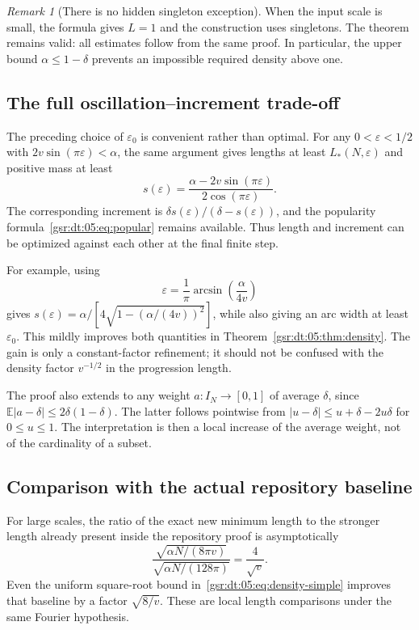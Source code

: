 \documentclass[11pt,letterpaper]{article}
\numberwithin{equation}{section}
\theoremstyle{definition}
\theoremstyle{remark}
\newtheorem{remark}[theorem]{Remark}
\newcommand{\E}{\mathbb E}
\newcommand{\1}{\mathbf 1}
\newcommand{\eps}{\varepsilon}
\begin{document}
\begin{remark}[There is no hidden singleton exception]
When the input scale is small, the formula gives $L=1$ and the construction uses singletons. The theorem remains valid: all estimates follow from the same proof. In particular, the upper bound $\alpha\leq1-\delta$ prevents an impossible required density above one.
\end{remark}

\subsection{The full oscillation--increment trade-off}
The preceding choice of $\eps_0$ is convenient rather than optimal. For any $0<\eps<1/2$ with $2v\sin(\pi\eps)<\alpha$, the same argument gives lengths at least $L_*(N,\eps)$ and positive mass at least
\begin{equation}
 s(\eps)=\frac{\alpha-2v\sin(\pi\eps)}{2\cos(\pi\eps)}.
 \label{gsr:dt:05:eq:s-epsilon}
\end{equation}
The corresponding increment is $\delta s(\eps)/(\delta-s(\eps))$, and the popularity formula~\eqref{gsr:dt:05:eq:popular} remains available. Thus length and increment can be optimized against each other at the final finite step.

For example, using
\[
 \eps=\frac1\pi\arcsin\!\left(\frac\alpha{4v}\right)
\]
gives $s(\eps)=\alpha/[4\sqrt{1-(\alpha/(4v))^2}]$, while also giving an arc width at least $\eps_0$. This mildly improves both quantities in Theorem~\ref{gsr:dt:05:thm:density}. The gain is only a constant-factor refinement; it should not be confused with the density factor $v^{-1/2}$ in the progression length.

The proof also extends to any weight $a:I_N\to[0,1]$ of average $\delta$, since
$\E|a-\delta|\leq2\delta(1-\delta)$. The latter follows pointwise from
$|u-\delta|\leq u+\delta-2u\delta$ for $0\leq u\leq1$. The interpretation is then a local increase of the average weight, not of the cardinality of a subset.

\subsection{Comparison with the actual repository baseline}
For large scales, the ratio of the exact new minimum length to the stronger length already present inside the repository proof is asymptotically
\begin{equation}
 \frac{\sqrt{\alpha N/(8\pi v)}}{\sqrt{\alpha N/(128\pi)}}
 =\frac4{\sqrt v}.
 \label{gsr:dt:05:eq:ratio}
\end{equation}
Even the uniform square-root bound in~\eqref{gsr:dt:05:eq:density-simple} improves that baseline by a factor $\sqrt{8/v}$. These are local length comparisons under the same Fourier hypothesis.
\end{document}
